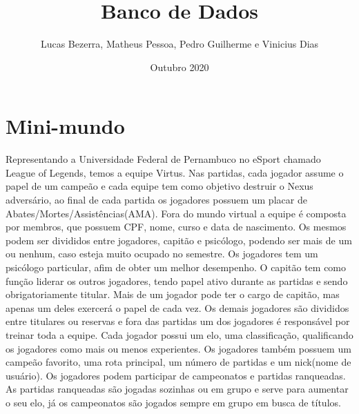 \documentclass[]{article}
\title{Banco de Dados}
\author{Lucas Bezerra, Matheus Pessoa, Pedro Guilherme e Vinicius Dias}
\affil{Centro de Ciências Exatas e da Natureza - UFPE\\
	Banco de Dados\\
	Prof. Mário Gomes de Melo}
\date{Outubro 2020}
\begin{document}
\maketitle

\section{Mini-mundo}
Representando a Universidade Federal de Pernambuco no eSport chamado League of Legends, temos a equipe Virtus. Nas partidas, cada jogador assume o papel de um campeão e cada equipe tem como objetivo destruir o Nexus adversário, ao final de cada partida os jogadores possuem um placar de Abates/Mortes/Assistências(AMA). Fora do mundo virtual a equipe é composta por membros, que possuem CPF, nome, curso e data de nascimento. Os mesmos podem ser divididos entre jogadores, capitão e psicólogo, podendo ser mais de um ou nenhum, caso esteja muito ocupado no semestre. Os jogadores tem um psicólogo particular, afim de obter um melhor desempenho. O capitão tem como função liderar os outros jogadores, tendo papel ativo durante as partidas e sendo obrigatoriamente titular. Mais de um jogador pode ter o cargo de capitão, mas apenas um deles exercerá o papel de cada vez. Os demais jogadores são divididos entre titulares ou reservas e fora das partidas um dos jogadores é responsável por treinar toda a equipe. Cada jogador possui um elo, uma classificação, qualificando os jogadores como mais ou menos experientes. Os jogadores também possuem um campeão favorito, uma rota principal, um número de partidas e um nick(nome de usuário). Os jogadores podem participar de campeonatos e partidas ranqueadas. As partidas ranqueadas são jogadas sozinhas ou em grupo e serve para aumentar o seu elo, já os campeonatos são jogados sempre em grupo em busca de títulos.
\end{document}
